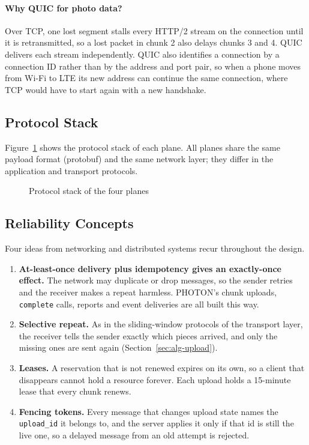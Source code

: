 \paragraph{Why QUIC for photo data?} Over TCP, one lost segment stalls every HTTP/2 stream on the connection until it is retransmitted, so a lost packet in chunk 2 also delays chunks 3 and 4. QUIC delivers each stream independently. QUIC also identifies a connection by a connection ID rather than by the address and port pair, so when a phone moves from Wi-Fi to LTE its new address can continue the same connection, where TCP would have to start again with a new handshake.

\subsection{Protocol Stack}

Figure~\ref{fig:stack} shows the protocol stack of each plane. All planes share the same payload format (protobuf) and the same network layer; they differ in the application and transport protocols.

\begin{figure}[H]
\centering
{}
\caption{Protocol stack of the four planes}\label{fig:stack}
\end{figure}

\subsection{Reliability Concepts}

Four ideas from networking and distributed systems recur throughout the design.

\begin{enumerate}
  \item \textbf{At-least-once delivery plus idempotency gives an exactly-once effect.} The network may duplicate or drop messages, so the sender retries and the receiver makes a repeat harmless. PHOTON's chunk uploads, \texttt{complete} calls, reports and event deliveries are all built this way.
  \item \textbf{Selective repeat.} As in the sliding-window protocols of the transport layer, the receiver tells the sender exactly which pieces arrived, and only the missing ones are sent again (Section~\ref{sec:alg-upload}).
  \item \textbf{Leases.} A reservation that is not renewed expires on its own, so a client that disappears cannot hold a resource forever. Each upload holds a 15-minute lease that every chunk renews.
  \item \textbf{Fencing tokens.} Every message that changes upload state names the \texttt{upload\_id} it belongs to, and the server applies it only if that id is still the live one, so a delayed message from an old attempt is rejected.
\end{enumerate}

